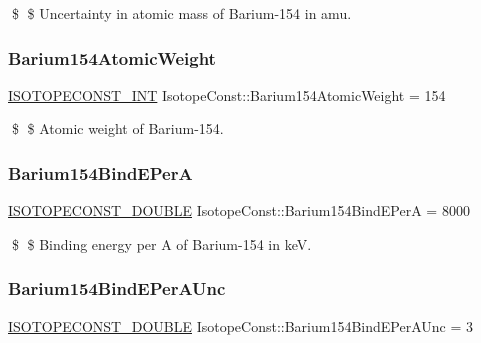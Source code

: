 \$ \$ Uncertainty in atomic mass of Barium-\/154 in amu. \mbox{\label{group___isotope_const-_barium-_ba154_ga6399d40f80ddaa60b9e30e8e5bd1778f}} 
\subsubsection{\texorpdfstring{Barium154\+Atomic\+Weight}{Barium154AtomicWeight}}
{\footnotesize\ttfamily \mbox{\hyperlink{group___isotope_const-_macros_ga5f18360b3e99483a35c32d789e62621c}{I\+S\+O\+T\+O\+P\+E\+C\+O\+N\+S\+T\+\_\+\+I\+NT}} Isotope\+Const\+::\+Barium154\+Atomic\+Weight = 154}

\$ \$ Atomic weight of Barium-\/154. \mbox{\label{group___isotope_const-_barium-_ba154_ga3f83527df957ce95c0ed9fcb5db63d6c}} 
\subsubsection{\texorpdfstring{Barium154\+Bind\+E\+PerA}{Barium154BindEPerA}}
{\footnotesize\ttfamily \mbox{\hyperlink{group___isotope_const-_macros_ga8f45a7272ce02c0b4c65c44636ed719a}{I\+S\+O\+T\+O\+P\+E\+C\+O\+N\+S\+T\+\_\+\+D\+O\+U\+B\+LE}} Isotope\+Const\+::\+Barium154\+Bind\+E\+PerA = 8000}

\$ \$ Binding energy per A of Barium-\/154 in keV. \mbox{\label{group___isotope_const-_barium-_ba154_ga091f08f97b1da3a710993f5d456e74fc}} 
\subsubsection{\texorpdfstring{Barium154\+Bind\+E\+Per\+A\+Unc}{Barium154BindEPerAUnc}}
{\footnotesize\ttfamily \mbox{\hyperlink{group___isotope_const-_macros_ga8f45a7272ce02c0b4c65c44636ed719a}{I\+S\+O\+T\+O\+P\+E\+C\+O\+N\+S\+T\+\_\+\+D\+O\+U\+B\+LE}} Isotope\+Const\+::\+Barium154\+Bind\+E\+Per\+A\+Unc = 3}

